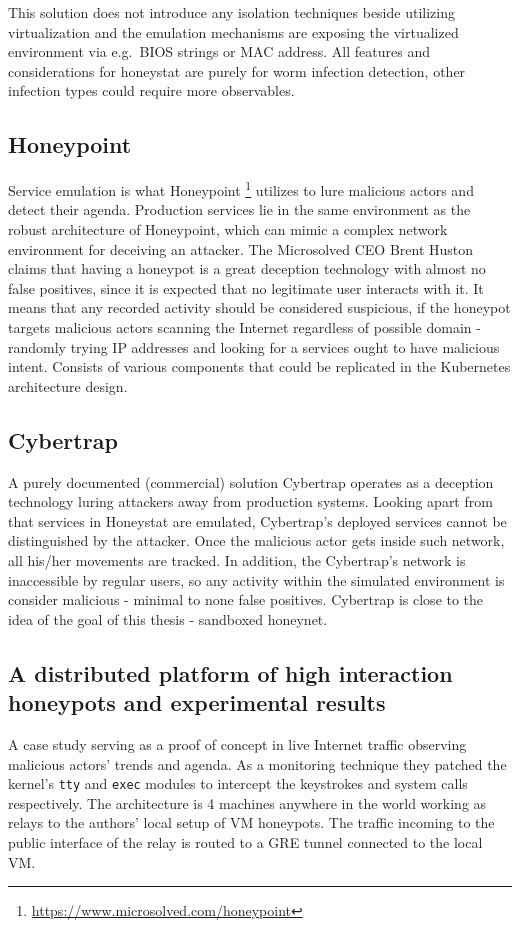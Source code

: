 This solution does not introduce any isolation techniques beside utilizing virtualization and the emulation mechanisms are exposing the virtualized environment via e.g.~BIOS strings or MAC address. All features and considerations for honeystat are purely for worm infection detection, other infection types could require more observables.

\subsection{Honeypoint \label{related:active-anal:honeypoint}}
Service emulation is what Honeypoint \footnote{\url{https://www.microsolved.com/honeypoint}} utilizes to lure malicious actors and detect their agenda. Production services lie in the same environment as the robust architecture of Honeypoint, which can mimic a complex network environment for deceiving an attacker. The Microsolved CEO Brent Huston claims \cite{podcast:honeypoint} that having a honeypot is a great deception technology with almost no false positives, since it is expected that no legitimate user interacts with it. It means that any recorded activity should be considered suspicious, if the honeypot targets malicious actors scanning the Internet regardless of possible domain - randomly trying IP addresses and looking for a services ought to have malicious intent. Consists of various components \cite{docs:honeypoint} that could be replicated in the Kubernetes architecture design.

\subsection{Cybertrap \label{related:active-anal:cybertrap}}
A purely documented (commercial) solution Cybertrap \cite{site:cybertrap} operates as a deception technology luring attackers away from production systems. Looking apart from that services in Honeystat are emulated, Cybertrap's deployed services cannot be distinguished by the attacker. Once the malicious actor gets inside such network, all his/her movements are tracked. In addition, the Cybertrap's network is inaccessible by regular users, so any activity within the simulated environment is consider malicious - minimal to none false positives. Cybertrap is close to the idea of the goal of this thesis - sandboxed honeynet.

\subsection{A distributed platform of high interaction honeypots and experimental results \label{related:active-anal:hih-study}}
A case study \cite{study:hih} serving as a proof of concept in live Internet traffic observing malicious actors' trends and agenda. As a monitoring technique they patched the kernel's \texttt{tty} and \texttt{exec} modules to intercept the keystrokes and system calls respectively. The architecture is 4 machines anywhere in the world working as relays to the authors' local setup of VM honeypots. The traffic incoming to the public interface of
the relay is routed to a GRE tunnel connected to the local VM.

